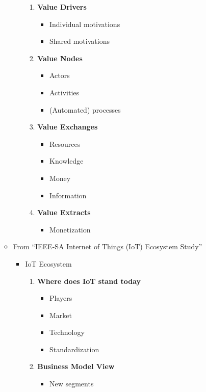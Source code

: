 \begin{itemize}
\begin{itemize}
\begin{itemize}
					\begin{enumerate}[I]
						\item \textbf{Value Drivers}
						\begin{itemize}
							\item Individual motivations
							\item Shared motivations
						\end{itemize}
						\item \textbf{Value Nodes}
						\begin{itemize}
							\item Actors
							\item Activities
							\item (Automated) processes
						\end{itemize}
						\item \textbf{Value Exchanges}
						\begin{itemize}
							\item Resources
							\item Knowledge
							\item Money
							\item Information
						\end{itemize}
						\item \textbf{Value Extracts}
						\begin{itemize}
							\item Monetization
						\end{itemize}					
					\end{enumerate}
				\end{itemize}
				\item From ``IEEE-SA Internet of Things (IoT) Ecosystem Study'' \cite{cisco}
					\begin{itemize}
						\item IoT Ecosystem
							\begin{enumerate}[I]
								\item \textbf{Where does IoT stand today}
									\begin{itemize}
										\item Players
										\item Market
										\item Technology
										\item Standardization
									\end{itemize}
								\item \textbf{Business Model View}
									\begin{itemize}
										\item New segments

\end{itemize}
\end{enumerate}
\end{itemize}
\end{itemize}
\end{itemize}
